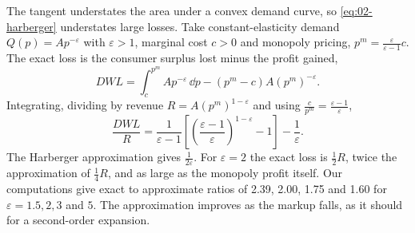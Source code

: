 \begin{remark}\label{rem:02-harberger-accuracy}
The tangent understates the area under a convex demand curve, so \eqref{eq:02-harberger} understates large losses.
Take constant-elasticity demand $Q(p) = Ap^{-\varepsilon}$ with $\varepsilon > 1$, marginal cost $c > 0$ and
monopoly pricing, $p^m = \frac{\varepsilon}{\varepsilon - 1}c$. The exact loss is the consumer surplus lost minus the profit gained,
\begin{equation*}
\mathit{DWL} = \int_c^{p^m} Ap^{-\varepsilon}\,\dd p - (p^m - c)A(p^m)^{-\varepsilon} .
\end{equation*}
Integrating, dividing by revenue $R = A(p^m)^{1-\varepsilon}$ and using $\frac{c}{p^m} = \frac{\varepsilon - 1}{\varepsilon}$,
\begin{equation*}
\frac{\mathit{DWL}}{R} = \frac{1}{\varepsilon - 1}\left[\left(\frac{\varepsilon - 1}{\varepsilon}\right)^{1 - \varepsilon} - 1\right]
- \frac{1}{\varepsilon} .
\end{equation*}
The Harberger approximation gives $\frac{1}{2\varepsilon}$. For $\varepsilon = 2$ the exact loss is $\frac{1}{2}R$,
twice the approximation of $\frac{1}{4}R$, and as large as the monopoly profit itself. Our computations give exact
to approximate ratios of 2.39, 2.00, 1.75 and 1.60 for $\varepsilon = 1.5, 2, 3$ and $5$. The approximation
improves as the markup falls, as it should for a second-order expansion.
\end{remark}

